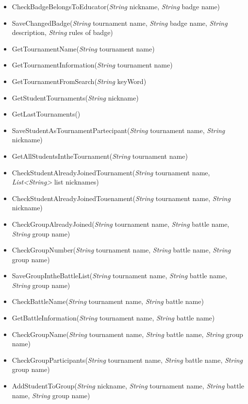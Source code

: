 \begin{itemize}
\begin{itemize}
        \item CheckBadgeBelongsToEducator(\textit{String} nickname, \textit{String} badge name)
        \item SaveChangedBadge(\textit{String} tournament name, \textit{String} badge name, \textit{String} description, \textit{String} rules of badge)
        \item GetTournamentName(\textit{String} tournament name)
        \item GetTournamentInformation(\textit{String} tournament name)
        \item GetTournamentFromSearch(\textit{String} keyWord)
        \item GetStudentTournaments(\textit{String} nickname)
        \item GetLastTournaments()
        \item SaveStudentAsTournamentPartecipant(\textit{String} tournament name, \textit{String} nickname)
        \item GetAllStudentsIntheTournament(\textit{String} tournament name)
        \item CheckStudentAlreadyJoinedTournament(\textit{String} tournament name, \textit{List\textless String\textgreater} list nicknames)
        \item CheckStudentAlreadyJoinedTouenament(\textit{String} tournament name, \textit{String} nickname)
        \item CheckGroupAlreadyJoined(\textit{String} tournament name, \textit{String} battle name, \textit{String} group name)
        \item CheckGroupNumber(\textit{String} tournament name, \textit{String} battle name, \textit{String} group name)
        \item SaveGroupIntheBattleList(\textit{String} tournament name, \textit{String} battle name, \textit{String} group name)
        \item CheckBattleName(\textit{String} tournament name, \textit{String} battle name)
        \item GetBattleInformation(\textit{String} tournament name, \textit{String} battle name)
        \item CheckGroupName(\textit{String} tournament name, \textit{String} battle name, \textit{String} group name)
        \item CheckGroupParticipants(\textit{String} tournament name, \textit{String} battle name, \textit{String} group name)
        \item AddStudentToGroup(\textit{String} nickname, \textit{String} tournament name, \textit{String} battle name, \textit{String} group name)

\end{itemize}
\end{itemize}
